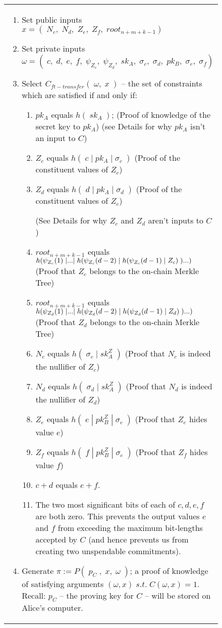 \documentclass{article}
\DeclarePairedDelimiter\br{(}{)}
\begin{document}
\begin{figure}[H]
\begin{center}
\begin{framed}
\begin{tabular}{p{16cm}}
\begin{enumerate}
          \item Set public inputs $x = (\;N_c,\;N_d,\;Z_e,\;Z_f,\;root_{n+m+k-1})$
          \item Set private inputs $\omega = (\;c,\;d,\;e,\;f,\;\psi_{Z_c},\;\psi_{Z_d},\;sk_A,\;\sigma_c,\;\sigma_d,\;pk_B,\;\sigma_e,\;\sigma_f)$
          \item Select $C_{ft-transfer}(\;\omega,\;x\;)$ -- the set of constraints which are satisfied if and only if:
          \begin{enumerate}
            \item $pk_A$ equals $h(\;sk_A\;)$; (Proof of knowledge of the secret key to $pk_A$) (see Details for why $pk_A$ isn't an input to $C$)
            \item $Z_c$ equals $h(\;c\;|\;pk_A\;|\;\sigma_c\;)$ (Proof of the constituent values of $Z_c$)
            \item $Z_d$ equals $h(\;d\;|\;pk_A\;|\;\sigma_d\;)$ (Proof of the constituent values of $Z_c$)

            (See Details for why $Z_c$ and $Z_d$ aren't inputs to $C$)
            \item $root_{n+m+k-1}$ equals $h\br*{\psi_{Z_c}(1)\;|...|\;h\br*{\psi_{Z_c}(d-2)\;|\;h\br*{\psi_{Z_c}(d-1)\;|\;Z_c}\;}...}$ (Proof that $Z_c$ belongs to the on-chain Merkle Tree)
            \item $root_{n+m+k-1}$ equals $h\br*{\psi_{Z_d}(1)\;|...|\;h\br*{\psi_{Z_d}(d-2)\;|\;h\br*{\psi_{Z_d}(d-1)\;|\;Z_d}\;}...}$ (Proof that $Z_d$ belongs to the on-chain Merkle Tree)
            \item $N_c$ equals $h(\;\sigma_c\;|\;sk^Z_A\;)$ (Proof that $N_c$ is indeed the nullifier of $Z_c$)
            \item $N_d$ equals $h(\;\sigma_d\;|\;sk^Z_A\;)$ (Proof that $N_d$ is indeed the nullifier of $Z_d$)
            \item $Z_e$ equals $h(\;e\;|\;pk^Z_B\;|\;\sigma_e\;)$ (Proof that $Z_e$ hides value $e$)
            \item $Z_f$ equals $h(\;f\;|\;pk^Z_B\;|\;\sigma_e\;)$ (Proof that $Z_f$ hides value $f$)
            \item $c + d$ equals $e + f$.
            \item The two most significant bits of each of $c, d, e, f$ are both zero. This prevents the output values $e$ and $f$ from exceeding the maximum bit-lengths accepted by $C$ (and hence prevents us from creating two unspendable commitments).
          \end{enumerate}
          \item Generate $\pi := P(\;p_C\;,\;x,\;\omega\;)$; a proof of knowledge of satisfying arguments $(\omega, x)\;s.t.\;C(\omega, x) = 1$. Recall: $p_C$ -- the proving key for $C$ -- will be stored on Alice's computer.


\end{enumerate}
\end{tabular}
\end{framed}
\end{center}
\end{figure}
\end{document}
